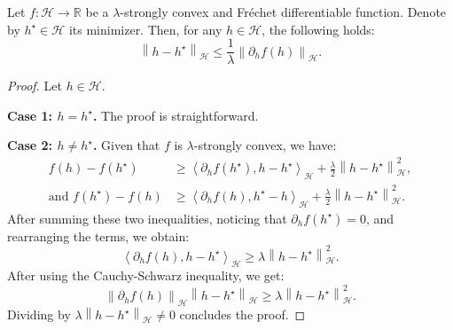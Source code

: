 \begin{lemma}\label{lem:h_min_hstar}
Let $f:\mathcal{H}\to\mathbb{R}$ be a $\lambda$-strongly convex and Fr\'echet differentiable function. Denote by $h^\star\in\mathcal{H}$ its minimizer. Then, for any $h\in\mathcal{H}$, the following holds:
\begin{equation*}
    \left\|h-h^\star\right\|_\mathcal{H}\leq\frac{1}{\lambda}\left\|\partial_h f(h)\right\|_\mathcal{H}.
\end{equation*}
\end{lemma}

\begin{proof}
Let $h\in\mathcal{H}$. 

\textbf{Case 1: $h=h^\star$. }The proof is straightforward.

\textbf{Case 2: $h\neq h^\star$. }Given that $f$ is $\lambda$-strongly convex, we have:
\begin{align*}
    f(h)-f(h^\star)&\geq\left\langle\partial_h f(h^\star),h-h^\star\right\rangle_\mathcal{H}+\frac{\lambda}{2}\left\|h-h^\star\right\|_\mathcal{H}^2,\\
    \text{and }f(h^\star)-f(h)&\geq\left\langle\partial_h f(h),h^\star-h\right\rangle_\mathcal{H}+\frac{\lambda}{2}\left\|h-h^\star\right\|_\mathcal{H}^2.
\end{align*}
After summing these two inequalities, noticing that $\partial_h f(h^\star)=0$, and rearranging the terms, we obtain:
\begin{equation*}
    \left\langle\partial_h f(h),h-h^\star\right\rangle_\mathcal{H}\geq\lambda\left\|h-h^\star\right\|_\mathcal{H}^2.
\end{equation*}
After using the Cauchy-Schwarz inequality, we get:
\begin{equation*}
    \left\|\partial_h f(h)\right\|_\mathcal{H}\left\|h-h^\star\right\|_\mathcal{H}\geq\lambda\left\|h-h^\star\right\|_\mathcal{H}^2.
\end{equation*}
Dividing by $\lambda\left\|h-h^\star\right\|_\mathcal{H}\neq0$ concludes the proof.
\end{proof}


